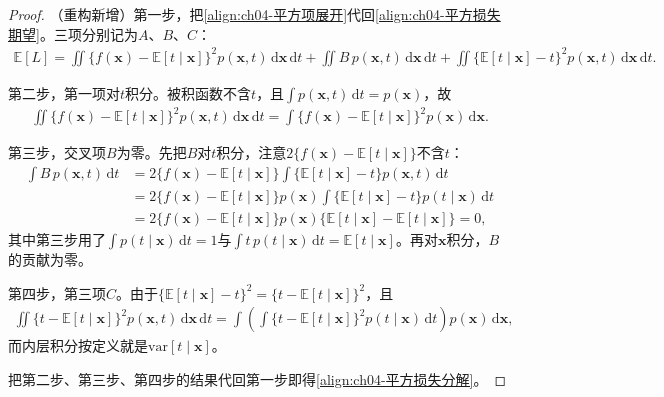 \documentclass[../../main.tex]{subfiles}
\begin{document}
\begin{proof}
（重构新增）第一步，把\eqref{align:ch04-平方项展开}代回\eqref{align:ch04-平方损失期望}。三项分别记为$A$、$B$、$C$：
\begin{align*}
  \mathbb{E}[L]=\iint\{f(\boldsymbol{x})-\mathbb{E}[t\mid\boldsymbol{x}]\}^2p(\boldsymbol{x},t)\,\mathrm{d}\boldsymbol{x}\,\mathrm{d}t
  +\iint B\,p(\boldsymbol{x},t)\,\mathrm{d}\boldsymbol{x}\,\mathrm{d}t
  +\iint\{\mathbb{E}[t\mid\boldsymbol{x}]-t\}^2p(\boldsymbol{x},t)\,\mathrm{d}\boldsymbol{x}\,\mathrm{d}t.
\end{align*}

第二步，第一项对$t$积分。被积函数不含$t$，且$\int p(\boldsymbol{x},t)\,\mathrm{d}t=p(\boldsymbol{x})$，故
\begin{align*}
  \iint\{f(\boldsymbol{x})-\mathbb{E}[t\mid\boldsymbol{x}]\}^2p(\boldsymbol{x},t)\,\mathrm{d}\boldsymbol{x}\,\mathrm{d}t
  =\int\{f(\boldsymbol{x})-\mathbb{E}[t\mid\boldsymbol{x}]\}^2p(\boldsymbol{x})\,\mathrm{d}\boldsymbol{x}.
\end{align*}

第三步，交叉项$B$为零。先把$B$对$t$积分，注意$2\{f(\boldsymbol{x})-\mathbb{E}[t\mid\boldsymbol{x}]\}$不含$t$：
\begin{align*}
  \int B\,p(\boldsymbol{x},t)\,\mathrm{d}t
  &=2\{f(\boldsymbol{x})-\mathbb{E}[t\mid\boldsymbol{x}]\}\int\{\mathbb{E}[t\mid\boldsymbol{x}]-t\}p(\boldsymbol{x},t)\,\mathrm{d}t\\
  &=2\{f(\boldsymbol{x})-\mathbb{E}[t\mid\boldsymbol{x}]\}p(\boldsymbol{x})\int\{\mathbb{E}[t\mid\boldsymbol{x}]-t\}p(t\mid\boldsymbol{x})\,\mathrm{d}t\\
  &=2\{f(\boldsymbol{x})-\mathbb{E}[t\mid\boldsymbol{x}]\}p(\boldsymbol{x})\bigl\{\mathbb{E}[t\mid\boldsymbol{x}]-\mathbb{E}[t\mid\boldsymbol{x}]\bigr\}=0,
\end{align*}
其中第三步用了$\int p(t\mid\boldsymbol{x})\,\mathrm{d}t=1$与$\int t\,p(t\mid\boldsymbol{x})\,\mathrm{d}t=\mathbb{E}[t\mid\boldsymbol{x}]$。再对$\boldsymbol{x}$积分，$B$的贡献为零。

第四步，第三项$C$。由于$\{\mathbb{E}[t\mid\boldsymbol{x}]-t\}^2=\{t-\mathbb{E}[t\mid\boldsymbol{x}]\}^2$，且
\begin{align*}
  \iint\{t-\mathbb{E}[t\mid\boldsymbol{x}]\}^2p(\boldsymbol{x},t)\,\mathrm{d}\boldsymbol{x}\,\mathrm{d}t
  =\int\left(\int\{t-\mathbb{E}[t\mid\boldsymbol{x}]\}^2p(t\mid\boldsymbol{x})\,\mathrm{d}t\right)p(\boldsymbol{x})\,\mathrm{d}\boldsymbol{x},
\end{align*}
而内层积分按定义就是$\mathrm{var}[t\mid\boldsymbol{x}]$。

把第二步、第三步、第四步的结果代回第一步即得\eqref{align:ch04-平方损失分解}。
\end{proof}
\end{document}
